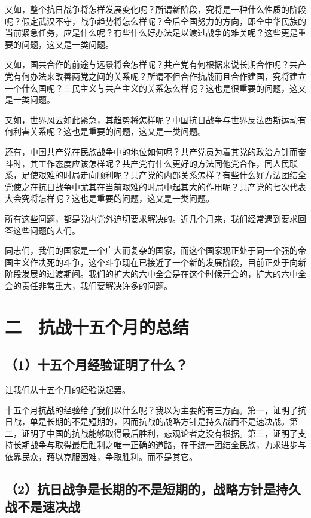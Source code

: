 又如，整个抗日战争将怎样发展变化呢？所谓新阶段，究将是一种什么性质的阶段呢？假定武汉不守，战争趋势将怎么样呢？今后全国努力的方向，即全中华民族的当前紧急任务，应是什么呢？有些什么好办法足以渡过战争的难关呢？这些更是重要的问题，这又是一类问题。

又如，国共合作的前途与远景将会怎样呢？共产党有何根据来说长期合作呢？共产党有何办法来改善两党之间的关系呢？所谓不但合作抗战而且合作建国，究将建立一个什么国呢？三民主义与共产主义的关系怎么样呢？这也是很重要的问题，这又是一类问题。

又如，世界风云如此紧急，其趋势将怎样呢？中国抗日战争与世界反法西斯运动有何利害关系呢？这也是重要的问题，这又是一类问题。

还有，中国共产党在民族战争中的地位如何呢？共产党员为着其党的政治方针而奋斗时，其工作态度应该怎样呢？共产党有什么更好的方法同他党合作，同人民联系，足使艰难的时局走向顺利呢？共产党的内部关系怎样？有些什么好方法团结全党使之在抗日战争中尤其在当前艰难的时局中起其大的作用呢？共产党的七次代表大会究将怎样呢？这也是重要的问题，这又是一类问题。

所有这些问题，都是党内党外迫切要求解决的。近几个月来，我们经常遇到要求回答这些问题的人们。

同志们，我们的国家是一个广大而复杂的国家，而这个国家现正处于同一个强的帝国主义作决死的斗争，这个斗争现在已接近了一个新的发展阶段，目前正处于向新阶段发展的过渡期间。我们的扩大的六中全会是在这个时候开会的，扩大的六中全会的责任非常重大，我们要解决许多的问题。

\section{二　抗战十五个月的总结}

\subsection{（1）十五个月经验证明了什么？}

让我们从十五个月的经验说起罢。

十五个月抗战的经验给了我们以什么呢？我以为主要的有三方面。第一，证明了抗日战，单是长期的不是短期的，因而抗战的战略方针是持久战而不是速决战。第二，证明了中国的抗战能够取得最后胜利，悲观论者之没有根据。第三，证明了支持长期战争与取得最后胜利之唯一正确的道路，在于统一团结全民族，力求进步与依靠民众，藉以克服困难，争取胜利。而不是其它。

\subsection{（2）抗日战争是长期的不是短期的，战略方针是持久战不是速决战}

